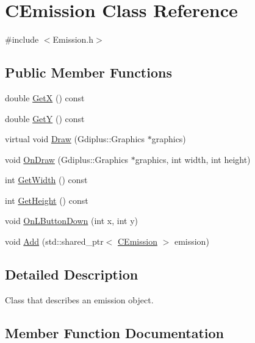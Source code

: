 \hypertarget{class_c_emission}{}\section{C\+Emission Class Reference}
\label{class_c_emission}


{\ttfamily \#include $<$Emission.\+h$>$}

\subsection*{Public Member Functions}
\begin{DoxyCompactItemize}
\item 
double \mbox{\hyperlink{class_c_emission_a92780d636d312e6e690537bf998bb6b4}{GetX}} () const
\item 
double \mbox{\hyperlink{class_c_emission_a178c4908ee2d2012556a0555c2eacef1}{GetY}} () const
\item 
virtual void \mbox{\hyperlink{class_c_emission_aad1f5c4fdc7c7ba286f17dd1cd43062d}{Draw}} (Gdiplus\+::\+Graphics $\ast$graphics)
\item 
void \mbox{\hyperlink{class_c_emission_a7e9bc8eacb04a716a41cd10e2ed81b9d}{On\+Draw}} (Gdiplus\+::\+Graphics $\ast$graphics, int width, int height)
\item 
int \mbox{\hyperlink{class_c_emission_a0a072a7fe378f16f9daed81dc875d722}{Get\+Width}} () const
\item 
int \mbox{\hyperlink{class_c_emission_af7f9f8206ef015c9ba50684f6ae1246b}{Get\+Height}} () const
\item 
void \mbox{\hyperlink{class_c_emission_aceed4a30851d5f48ba1f7e385913ade0}{On\+L\+Button\+Down}} (int x, int y)
\item 
void \mbox{\hyperlink{class_c_emission_ae2d5dd9c4317bf3bc59f956e66236e17}{Add}} (std\+::shared\+\_\+ptr$<$ \mbox{\hyperlink{class_c_emission}{C\+Emission}} $>$ emission)
\end{DoxyCompactItemize}


\subsection{Detailed Description}
Class that describes an emission object. 

\subsection{Member Function Documentation}
\mbox{\label{class_c_emission_ae2d5dd9c4317bf3bc59f956e66236e17}} 
